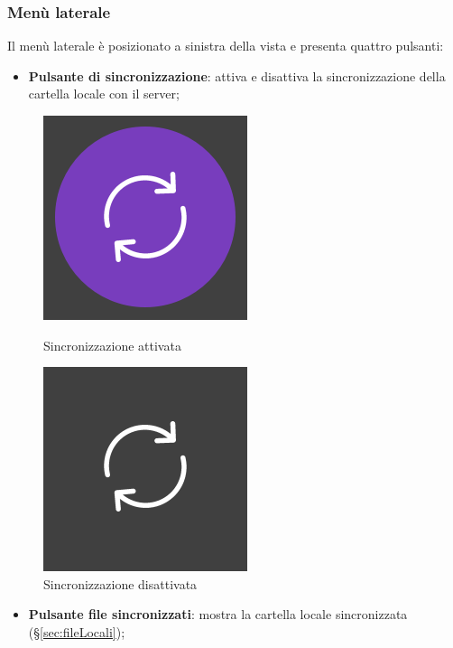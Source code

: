 \subsubsection{Menù laterale}
\label{sec:menu}
Il menù laterale è posizionato a sinistra della vista e presenta quattro pulsanti:
\begin{itemize}
\item \textbf{Pulsante di sincronizzazione}: attiva e disattiva la sincronizzazione della cartella locale con il server; \
\end{itemize}
\begin{figure}[H]
\centering
\begin{minipage}[b]{0.45\linewidth}
\centering
\includegraphics[scale=0.5]{components/img/SyncA.png}
\caption{Sincronizzazione attivata}
\label{fig:PsyncA}
\end{minipage}
\quad
\begin{minipage}[b]{0.45\linewidth}
\centering
\includegraphics[scale=0.5]{components/img/SyncD.png}
\caption{Sincronizzazione disattivata}
\label{fig:PsyncD}
\end{minipage}
\end{figure}
\begin{itemize}
\item \textbf{Pulsante file sincronizzati}: mostra la cartella locale sincronizzata (\S{}\ref{sec:fileLocali}); \
\end{itemize}
